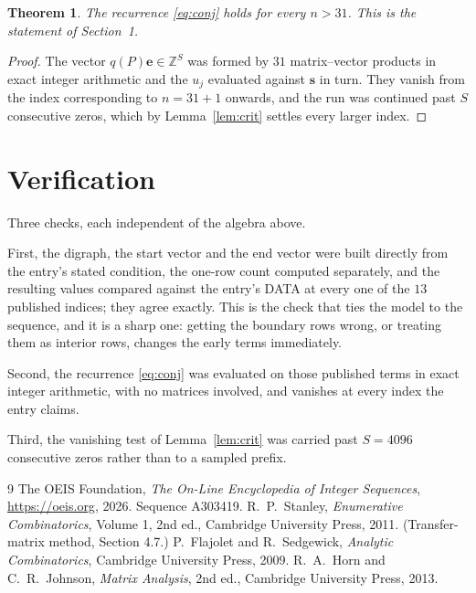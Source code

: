 \documentclass[11pt,a4paper]{article}
\theoremstyle{plain}
\newtheorem{theorem}{Theorem}
\theoremstyle{definition}
\begin{document}
\begin{theorem}
The recurrence \eqref{eq:conj} holds for every $n>31$. This is the statement of
Section~1.
\end{theorem}

\begin{proof}
The vector $q(P)\mathbf{e}\in\mathbb{Z}^{S}$ was formed by $31$ matrix--vector
products in exact integer arithmetic and the $u_j$ evaluated against $\mathbf{s}$ in turn.
They vanish from the index corresponding to $n=31+1$ onwards, and the run was continued
past $S$ consecutive zeros, which by Lemma~\ref{lem:crit} settles every larger index.
\end{proof}

\section{Verification}

Three checks, each independent of the algebra above.

First, the digraph, the start vector and the end vector were built directly from the
entry's stated condition, the one-row count computed separately, and the resulting values
compared against the entry's DATA at every one of the $13$ published indices; they
agree exactly. This is the check that ties the model to the sequence, and it is a sharp one:
getting the boundary rows wrong, or treating them as interior rows, changes the early terms
immediately.

Second, the recurrence \eqref{eq:conj} was evaluated on those published terms in exact
integer arithmetic, with no matrices involved, and vanishes at every index the entry claims.

Third, the vanishing test of Lemma~\ref{lem:crit} was carried past $S=4096$ consecutive
zeros rather than to a sampled prefix.

\begin{thebibliography}{9}
 The OEIS Foundation, \emph{The On-Line Encyclopedia of Integer
Sequences}, \url{https://oeis.org}, 2026. Sequence A303419.
 R.~P.~Stanley, \emph{Enumerative Combinatorics}, Volume 1, 2nd ed.,
Cambridge University Press, 2011. (Transfer-matrix method, Section 4.7.)
 P.~Flajolet and R.~Sedgewick, \emph{Analytic Combinatorics}, Cambridge
University Press, 2009.
 R.~A.~Horn and C.~R.~Johnson, \emph{Matrix Analysis}, 2nd ed., Cambridge
University Press, 2013.
\end{thebibliography}
\end{document}
